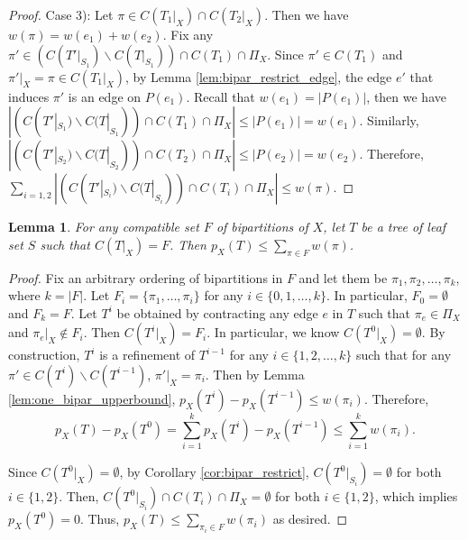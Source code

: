 \documentclass{bmcart}
\newtheorem{lemma}{Lemma}
\begin{document}
\begin{proof}
    Case 3): Let $\pi \in C(T_1|_X) \cap C(T_2|_X)$. Then we have $w(\pi) = w(e_1)+w(e_2)$. Fix any $\pi'\in (C(T'|_{S_1})\backslash C(T|_{S_1})) \cap C(T_1) \cap \Pi_X$. Since $\pi' \in C(T_1)$ and $\pi'|_X = \pi \in C(T_1|_X)$, by Lemma \ref{lem:bipar_restrict_edge}, the edge $e'$ that induces $\pi'$ is an edge on $P(e_1)$. Recall that $w(e_1) = |P(e_1)|$, then we have $|(C(T'|_{S_1})\backslash C(T|_{S_1})) \cap C(T_1) \cap \Pi_X| \le |P(e_1)| = w(e_1)$. Similarly, $|(C(T'|_{S_2})\backslash C(T|_{S_2})) \cap C(T_2) \cap \Pi_X| \le |P(e_2)| = w(e_2)$. Therefore, $\sum_{i = 1,2}|(C(T'|_{S_i})\backslash C(T|_{S_i})) \cap C(T_i) \cap \Pi_X| \le w(\pi)$.
\end{proof}


\begin{lemma} \label{lem:compatible_set_upperbound}
    For any compatible set $F$ of bipartitions of $X$, let $T$ be a tree of leaf set $S$ such that $C(T|_X) = F$. Then $p_X(T) \le \sum_{\pi \in F} w(\pi)$.
\end{lemma}
\begin{proof}
    
    Fix an arbitrary ordering of bipartitions in $F$ and let them be $\pi_1,\pi_2,\dots,\pi_k$, where $k = |F|$. Let $F_i = \{\pi_1,\dots, \pi_i\}$ for any $i \in \{0,1,\dots,k\}$. In particular, $F_0 = \emptyset$ and $F_k = F$. Let $T^i$ be obtained by contracting any edge $e$ in $T$ such that $\pi_e \in \Pi_X$ and $\pi_e|_X \notin F_i$. Then $C(T^i|_X) = F_i$. In particular, we know $C(T^0|_X) = \emptyset$. By construction, $T^i$ is a refinement of $T^{i-1}$ for any $i \in \{1,2,\dots,k\}$ such that for any $\pi' \in C(T^i)\backslash C(T^{i-1})$, $\pi'|_X = \pi_i$. Then by Lemma \ref{lem:one_bipar_upperbound}, $p_X(T^i) - p_X(T^{i-1}) \le w(\pi_i)$. Therefore, 
    \[p_X(T) - p_X(T^0) = \sum_{i = 1}^k p_X(T^i) - p_X(T^{i-1}) \le \sum_{i = 1}^k w(\pi_i).\]
    
    Since $C(T^0|_X) = \emptyset$, by Corollary \ref{cor:bipar_restrict}, $C(T^0|_{S_i}) = \emptyset$ for both $i \in \{1,2\}$. Then, $C(T^0|_{S_i}) \cap C(T_i) \cap \Pi_X = \emptyset$ for both $i \in \{1,2\}$, which implies $p_X(T^0) = 0$. Thus, $p_X(T) \le \sum_{\pi_i \in F}w(\pi_i)$ as desired.
\end{proof}
\end{document}
